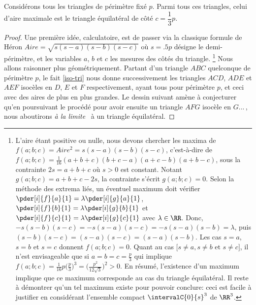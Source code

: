 \begin{fact}\label{iso-tri}
	Considérons tous les triangles de périmètre fixé $p$. Parmi tous ces triangles, celui d'aire maximale est le triangle équilatéral de côté $c = \dfrac13 p$.
\end{fact}


\begin{proof}
	Une première idée, calculatoire, est de passer via la classique formule de Héron $Aire = \sqrt{s(s - a)(s - b)(s - c)}$ où $s = \num{.5} p$ désigne le demi-périmètre, et les variables $a$, $b$ et $c$ les mesures des côtés du triangle.%
	\footnote{
		L'aire étant positive ou nulle, nous devons chercher les maxima de $f(a;b;c) = Aire^2 = s(s - a)(s - b)(s - c)$, c'est-à-dire de $f(a;b;c) = \frac{1}{16} (a + b + c)(b + c - a)(a + c - b)(a + b - c)$, sous la contrainte $2s = a + b + c$ où $s > 0$ est constant.
		Notant $g(a;b;c) = a + b + c - 2 s$, la contrainte s'écrit $g(a;b;c) = 0$.
		Selon la méthode des extrema liés, un éventuel maximum doit vérifier 
		$\pder[i]{f}{a}{1} = \lambda \pder[i]{g}{a}{1}$,
		$\pder[i]{f}{b}{1} = \lambda \pder[i]{g}{b}{1}$ et
		$\pder[i]{f}{c}{1} = \lambda \pder[i]{g}{c}{1}$
		avec $\lambda \in \RR$.
		Donc,
		$- s(s - b)(s - c) = - s(s - a)(s - c) = - s(s - a)(s - b) = \lambda$,
		puis
		$(s - b)(s - c) = (s - a)(s - c) = (s - a)(s - b)$.
		Les cas $s = a$, $s = b$ et $s = c$ donnent $f(a;b;c) = 0$.
		Quant au cas $\big[ s \neq a, s \neq b \text{ et } s \neq c \big]$, il n'est envisageable que si $a = b = c = \frac{p}{3}$ qui implique $f(a;b;c) = \frac{1}{16} p \big( \frac{p}{3} \big)^3 = \big( \frac{p^2}{12 \sqrt{3}} \big)^2 > 0$.
		En résumé, l'existence d'un maximum implique que ce maximum corresponde au cas du triangle équilatéral.
		Il reste à démontrer qu'un tel maximum existe pour pouvoir conclure: ceci est facile à justifier en considérant l'ensemble compact $\intervalC{0}{s}^3$ de $\RR^3$. 
	}
	Nous allons raisonner plus géométriquement.
	Partant d'un triangle $ABC$ quelconque de périmètre $p$, le fait \ref{iso-tri} nous donne successivement les triangles $ACD$, $ADE$ et $AEF$ isocèles en $D$, $E$ et $F$ respectivement, ayant tous pour périmètre $p$, et ceci avec des aires de plus en plus grandes.  
	Le dessin suivant amène à conjecturer qu'en poursuivant le procédé pour avoir ensuite un triangle $AFG$ isocèle en $G$...\,, nous aboutirons \og \emph{à la limite} \fg\ à un triangle équilatéral.


\end{proof}
